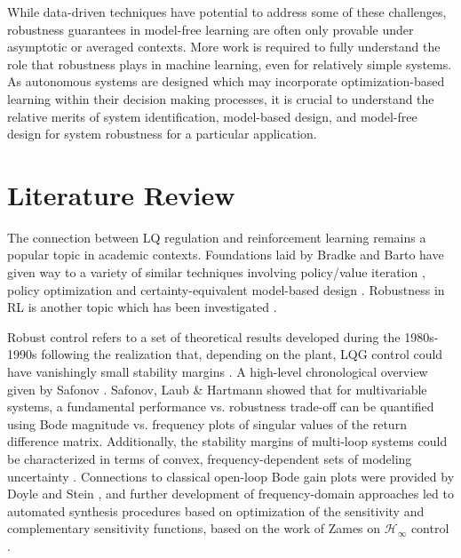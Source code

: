 While data-driven techniques have potential to address some of these challenges, robustness guarantees in model-free learning are often only provable under asymptotic or averaged contexts.  More work is required to fully understand the role that robustness plays in machine learning, even for relatively simple systems.  As autonomous systems are designed which may incorporate optimization-based learning within their decision making processes, it is crucial to understand the relative merits of system identification, model-based design, and model-free design for system robustness for a particular application.

\section{Literature Review}
\label{chap:introLiteratureReview}
The connection between LQ regulation and reinforcement learning remains a popular topic in academic contexts.  Foundations laid by Bradke and Barto \cite{bradtke1992reinforcement, bradtke1994adaptive} have given way to a variety of similar techniques involving policy/value iteration \cite{lamperski2020computing, yaghmaie2022linear, lewis2009adaptive, lewis2009reinforcement, farjadnasab2022model, wong2010reinforcement, lale2021adaptive, chen2019adaptive, cui2021combined, matni2019self, yaghmaie2019using, yang2021model, rizvi2018output, cohen2018online}, policy optimization \cite{malik2019derivative} and certainty-equivalent model-based design \cite{dean2020sample}.  Robustness in RL is another topic which has been investigated \cite{moos2022robust, venkataraman2019recovering, roberts2011feedback, pang2022robust, umenberger2019robust, dean2018regret, ho2019robust, bernat2020driver, al2007model, al2007model2, zhang2021derivative, zhang2020policy}.

Robust control refers to a set of theoretical results developed during the 1980s-1990s following the realization that, depending on the plant, LQG control could have vanishingly small stability margins \cite{doyle1978guaranteed}.  A high-level chronological overview given by Safonov \cite{safonov2012origins}.  Safonov, Laub \& Hartmann \cite{safonov1981feedback} showed that for multivariable systems, a fundamental performance vs. robustness trade-off can be quantified using Bode magnitude vs. frequency plots of singular values of the return difference matrix.  Additionally, the stability margins of multi-loop systems could be characterized in terms of convex, frequency-dependent sets of modeling uncertainty \cite{safonov1981multiloop}.  Connections to classical open-loop Bode gain plots were provided by Doyle and Stein \cite{doyle1981multivariable}, and further development of frequency-domain approaches led to automated synthesis procedures based on optimization of the sensitivity and complementary sensitivity functions, based on the work of Zames on $\mathcal{H}_{\infty}$ control \cite{zames1981feedback}.


